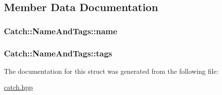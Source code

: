 \subsection{Member Data Documentation}
\hypertarget{struct_catch_1_1_name_and_tags_a7cbea60e0cebfa622c667008eb011420}{
\subsubsection[{name}]{ Catch\-::\-Name\-And\-Tags\-::name}}\label{struct_catch_1_1_name_and_tags_a7cbea60e0cebfa622c667008eb011420}
\hypertarget{struct_catch_1_1_name_and_tags_a74062ed1138834a348424eb7ed900c57}{
\subsubsection[{tags}]{ Catch\-::\-Name\-And\-Tags\-::tags}}\label{struct_catch_1_1_name_and_tags_a74062ed1138834a348424eb7ed900c57}


The documentation for this struct was generated from the following file\-:\begin{DoxyCompactItemize}
\item 
\hyperlink{catch_8hpp}{catch.\-hpp}\end{DoxyCompactItemize}
